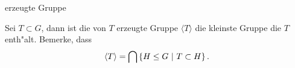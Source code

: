 \documentclass[class=article, crop=false]{standalone}
\begin{document}
\begin{zettel}{erzeugte Gruppe}
\begin{flashcard}[]{}
	\begin{definition}
		Sei $T \subset G$, dann ist die von $T$ erzeugte Gruppe $ \langle T\rangle $ die kleinste Gruppe die $T$ enth"alt.
		Bemerke, dass
		\[
			\langle T\rangle  = \bigcap \set{H \leq G}{T \subset H}
		.\]
	\end{definition}

\end{flashcard}
\end{zettel}
\end{document}
